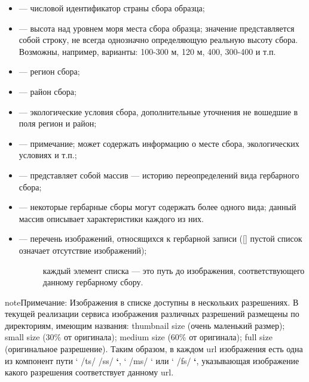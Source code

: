 \documentclass[letterpaper,10pt,russian]{sphinxmanual}
\begin{document}
\begin{itemize}
\item {} 
 — числовой идентификатор страны сбора образца;

\item {} 
 — высота над уровнем моря места сбора образца; значение представляется собой строку, не всегда однозначно определяющую реальную высоту сбора. Возможны, например, варианты: 100-300 м, 120 м, 400, 300-400 и т.п.

\item {} 
 — регион сбора;

\item {} 
 — район сбора;

\item {} 
 — экологические условия сбора, дополнительные уточнения не вошедшие в поля регион и район;

\item {} 
 — примечание; может содержать информацию о месте сбора, экологических условиях и т.п.;

\item {} 
 — представляет собой массив — историю переопределений вида гербарного сбора;

\item {} 
 — некоторые гербарные сборы могут содержать более одного вида; данный массив описывает характеристики каждого из них.

\item {} \begin{description}
\item[{ — перечень изображений, относящихся к гербарной записи ({[}{]} \textendash{} пустой список \textendash{} означает отсутствие изображений);}] \leavevmode
каждый элемент списка — это путь до изображения, соответствующего данному гербарному сбору.

\end{description}

\end{itemize}

\begin{sphinxadmonition}{note}{Примечание:}
Изображения в списке  доступны в нескольких разрешениях.
В текущей реализации сервиса изображения различных разрешений размещены по директориям,
имеющим названия:  \textendash{} thumbnail size (очень маленький размер);  \textendash{} small size (30\% от оригинала);
 \textendash{} medium size (60\% от оригинала);  \textendash{} full size (оригинальное разрешение).
Таким образом, в каждом url изображения есть одна из компонент пути {}` /ts/ \sphinxtitleref{,} /ss/ {\color{red}\bfseries{}{}`}, {}` /ms/ {}` или {}` /fs/ {\color{red}\bfseries{}{}`},
указывающая изображение какого разрешения соответствует данному url.
\end{sphinxadmonition}
\end{document}
